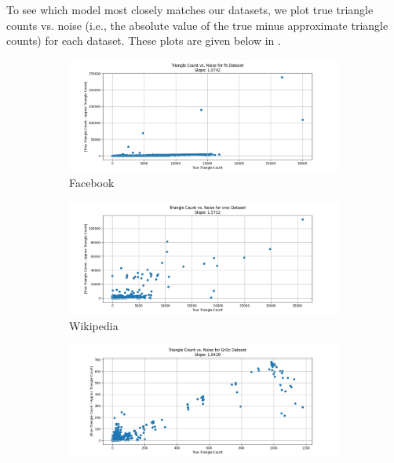 \documentclass[11pt, margin=1in]{article}
\begin{document}
To see which model most closely matches our datasets, we plot true triangle counts vs. noise (i.e., the absolute value of the true minus approximate triangle counts) for each dataset.
These plots are given below in .

\begin{figure}[H]
    \centering

    \begin{subfigure}[b]{0.49\textwidth}
        \centering
        \includegraphics[width=\textwidth]{plots/triangle-counts-vs-noise/fb_triangle_count_vs_noise.png}
        \caption{Facebook}
        \label{fig:tri_vs_noise_fb}
    \end{subfigure}
    \hfill
    \begin{subfigure}[b]{0.49\textwidth}
        \centering
        \includegraphics[width=\textwidth]{plots/triangle-counts-vs-noise/croc_triangle_count_vs_noise.png}
        \caption{Wikipedia}
        \label{fig:tri_vs_noise_croc}
    \end{subfigure}
    \hfill
    \begin{subfigure}[b]{0.49\textwidth}
        \centering
        \includegraphics[width=\textwidth]{plots/triangle-counts-vs-noise/GrQc_triangle_count_vs_noise.png}

\end{subfigure}
\end{figure}
\end{document}

